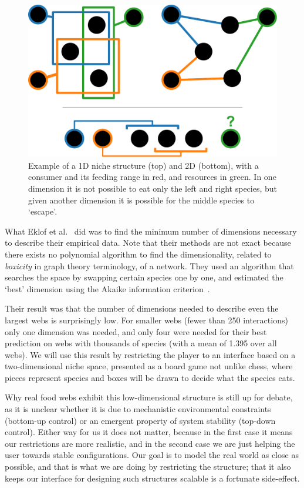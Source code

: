 \begin{figure}
  \centering
  \includegraphics[width=.8\linewidth]{niche.pdf}
  \caption{Example of a 1D niche structure (top) and 2D (bottom), with a consumer and its feeding range in red, and resources in green.
  In one dimension it is not possible to eat only the left and right species, but given another dimension it is possible for the middle species to `escape'.}
  \label{niche}
\end{figure}

What Eklof et al.~\cite{eklof} did was to find the minimum number of dimensions necessary to describe their empirical data. Note that their methods are not exact because there exists no polynomial algorithm to find the dimensionality, related to \emph{boxicity} in graph theory terminology, of a network. They used an algorithm that searches the space by swapping certain species one by one, and estimated the `best' dimension using the Akaike information criterion~\cite{eklof}.

Their result was that the number of dimensions needed to describe even the largest webs is surprisingly low. For smaller webs (fewer than 250 interactions) only one dimension was needed, and only four were needed for their best prediction on webs with thousands of species (with a mean of 1.395 over all webs).
We will use this result by restricting the player to an interface based on a two-dimensional niche space, presented as a board game not unlike chess, where pieces represent species and boxes will be drawn to decide what the species eats.

Why real food webs exhibit this low-dimensional structure is still up for debate, as it is unclear whether it is due to mechanistic environmental constraints (bottom-up control) or an emergent property of system stability (top-down control).
Either way for us it does not matter, because in the first case it means our restrictions are more realistic, and in the second case we are just helping the user towards stable configurations.
Our goal is to model the real world as close as possible, and that is what we are doing by restricting the structure; that it also keeps our interface for designing such structures scalable is a fortunate side-effect.

